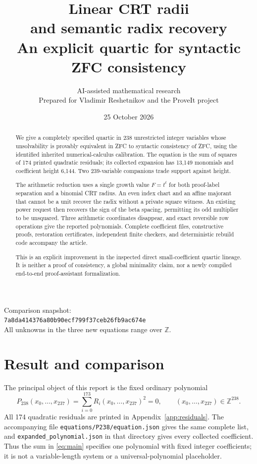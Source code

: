 \documentclass[11pt]{article}
\title{\color{ink}\bfseries Linear CRT radii\\and semantic radix recovery\\[0.5em]
\large An explicit quartic for syntactic ZFC consistency}
\author{AI-assisted mathematical research\\[0.3em]
\normalsize Prepared for Vladimir Reshetnikov and the ProveIt project}
\date{25 October 2026}
\begin{document}
\maketitle
\thispagestyle{empty}
\begin{abstract}
We give a completely specified quartic in 238 unrestricted integer variables
whose unsolvability is provably equivalent in ZFC to syntactic consistency
of ZFC, using the identified inherited numerical-calculus calibration.
The equation is the sum of squares of 174 printed quadratic residuals;
its collected expansion has 13,149 monomials and coefficient height 6,144.
Two 239-variable companions trade support against height.

The arithmetic reduction uses a single growth value \(F=t^t\) for both
proof-label separation and a binomial CRT radius. An even index chart and
an affine majorant that cannot be a unit recover the radix without a private
square witness. An existing power request then recovers the sign of the beta
spacing, permitting its odd multiplier to be unsquared. Three arithmetic
coordinates disappear, and exact reversible row operations give the reported
polynomials. Complete coefficient files, constructive proofs, restoration
certificates, independent finite checkers, and deterministic rebuild code
accompany the article.

This is an explicit improvement in the inspected direct small-coefficient
quartic lineage. It is neither a proof of consistency, a global minimality
claim, nor a newly compiled end-to-end proof-assistant formalization.
\end{abstract}
\vfill
\begin{center}\small
Comparison snapshot:\\
\texttt{7a8da414376a80b90ecf799f37ceb26fb9ac674e}\\
All unknowns in the three new equations range over \(\mathbb Z\).
\end{center}
\newpage
\tableofcontents
\newpage
\section{Result and comparison}

The principal object of this report is the fixed ordinary polynomial
\begin{equation}\label{eq:main}
 \boxed{P_{238}(x_0,\ldots,x_{237})
       =\sum_{i=0}^{173} R_i(x_0,\ldots,x_{237})^2=0,
       \qquad (x_0,\ldots,x_{237})\in\mathbb Z^{238}.}
\end{equation}
All 174 quadratic residuals are printed in Appendix~\ref{app:residuals}.
The accompanying file \nolinkurl{equations/P238/equation.json} gives the
same complete list, and \nolinkurl{expanded_polynomial.json} in that
directory gives every collected coefficient. Thus the sum in
\eqref{eq:main} specifies one polynomial with fixed integer coefficients;
it is not a variable-length system or a universal-polynomial placeholder.
\end{document}
